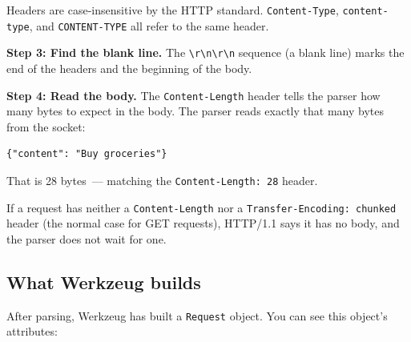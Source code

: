 \noindent{}Headers are case-insensitive by the HTTP standard. \texttt{Content-Type}, \texttt{content-type}, and \texttt{CONTENT-TYPE} all refer to the same header.

\textbf{Step 3: Find the blank line.} The \texttt{\textbackslash{}r\textbackslash{}n\textbackslash{}r\textbackslash{}n} sequence (a blank line) marks the end of the headers and the beginning of the body.

\textbf{Step 4: Read the body.} The \texttt{Content-Length} header tells the parser how many bytes to expect in the body. The parser reads exactly that many bytes from the socket:

\begin{outputbox}[short]
\begin{Verbatim}[fontsize=\codesize, breaklines, breakanywhere, breaksymbolleft={\tiny\textcolor{muted}{$\hookrightarrow$}}]
{"content": "Buy groceries"}
\end{Verbatim}
\end{outputbox}

\noindent{}That is 28 bytes~--- matching the \texttt{Content-Length:\ 28} header.

If a request has neither a \texttt{Content-Length} nor a \texttt{Transfer-}\allowbreak{}\texttt{Encoding:}\allowbreak{}\texttt{\ chunked} header (the normal case for GET requests), HTTP/1.1 says it has no body, and the parser does not wait for one.

\subsection*{What Werkzeug builds}\label{05-internal-request-execution:what-werkzeug-builds}

After parsing, Werkzeug has built a \texttt{Request} object. You can see this object's attributes:


